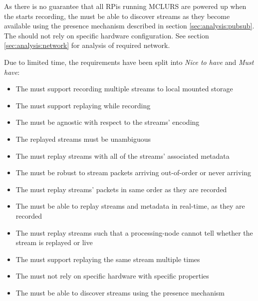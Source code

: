 As there is no guarantee that all RPis running \ac{MCLURS} are powered up when the  starts recording, the  must be able to discover streams as they become available using the presence mechanism described in section \ref{sec:analysis:pubsub}.
The  should not rely on specific hardware configuration. See section \ref{sec:analysis:network} for analysis of required network.

Due to limited time, the requirements have been split into \textit{Nice to have} and \textit{Must have}:

\begin{itemize}
	\item The  must support recording multiple streams to local mounted storage
	\item The  must support replaying while recording
	\item The  must be agnostic with respect to the streams' encoding
	\item The replayed streams must be unambiguous
	\item The  must replay streams with all of the streams' associated metadata
	\item The  must be robust to stream packets arriving out-of-order or never arriving
	\item The  must replay streams' packets in same order as they are recorded
	\item The  must be able to replay streams and metadata in real-time, as they are recorded
	\item The  must replay streams such that a processing-node cannot tell whether the stream is replayed or live
	\item The  must support replaying the same stream multiple times
	\item The  must not rely on specific hardware with specific properties
	\item The  must be able to discover streams using the presence mechanism
\end{itemize}

